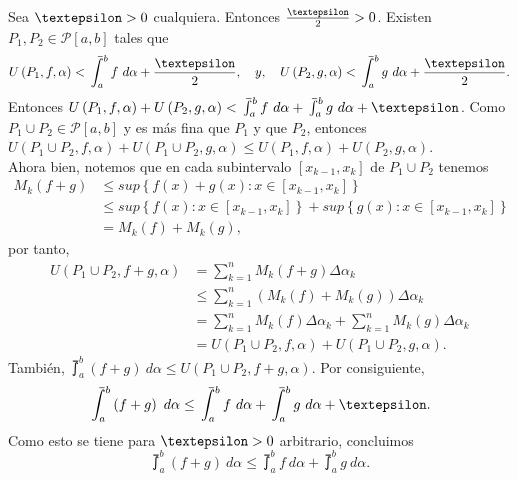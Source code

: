 Sea $\text{\textepsilon}>0$ cualquiera. Entonces $\frac{\text{\textepsilon}}{2}>0$. Existen $P_1,P_2\in\mathcal{P}\left[a,b\right]$ tales que
  \begin{equation*}
    U\left(P_1,f,\alpha\right) < \upint_a^b f\ d\alpha + \frac{\text{\textepsilon}}{2},\quad y,\quad U\left(P_2,g,\alpha\right) < \upint_a^b g\ d\alpha + \frac{\text{\textepsilon}}{2}.
  \end{equation*}
  Entonces $U\left(P_1,f,\alpha\right)+U\left(P_2,g,\alpha\right)<\upint_a^b f\ d\alpha + \upint_a^b g\ d\alpha + \text{\textepsilon}$. Como $P_1\cup P_2 \in \mathcal{P}\left[a,b\right]$ y es más fina que $P_1$ y que $P_2$, entonces $U\left(P_1\cup P_2,f,\alpha\right)+U\left(P_1\cup P_2,g,\alpha\right) \leq U\left(P_1,f,\alpha\right)+U\left(P_2,g,\alpha\right)$.\\
  Ahora bien, notemos que en cada subintervalo $\left[x_{k-1},x_k\right]$ de $P_1\cup P_2$ tenemos
  \begin{align*}
    M_k\left(f+g\right)&\leq sup\left\lbrace f\left(x\right)+g\left(x\right): x\in\left[x_{k-1},x_k\right]\right\rbrace\\
    &\leq sup\left\lbrace f\left(x\right): x\in\left[x_{k-1},x_k\right]\right\rbrace+sup\left\lbrace g\left(x\right): x\in\left[x_{k-1},x_k\right]\right\rbrace\\
    &=M_k\left(f\right)+M_k\left(g\right),
  \end{align*}
por tanto,
\begin{align*}
  U\left(P_1\cup P_2, f+g, \alpha\right)&= \sum_{k=1}^{n} M_k\left(f+g\right)\Delta\alpha_k\\
  &\leq\sum_{k=1}^{n} \left(M_k\left(f\right)+M_k\left(g\right)\right)\Delta\alpha_k\\
  &=\sum_{k=1}^{n} M_k\left(f\right)\Delta\alpha_k+\sum_{k=1}^{n} M_k\left(g\right)\Delta\alpha_k\\
  &=U\left(P_1\cup P_2, f, \alpha\right)+U\left(P_1\cup P_2, g, \alpha\right).
\end{align*}
También, $\upint_a^b\left(f+g\right)\ d\alpha \leq U\left(P_1\cup P_2, f+g, \alpha\right)$. Por consiguiente,
\begin{equation*}
\upint_a^b \left(f+g\right)\ d\alpha \leq \upint_a^b f\ d\alpha + \upint_a^b g\ d\alpha +  \text{\textepsilon}.
\end{equation*}
Como esto se tiene para $\text{\textepsilon}>0$ arbitrario, concluimos
\begin{equation*}
\upint_a^b \left(f+g\right)\ d\alpha \leq \upint_a^b f\ d\alpha + \upint_a^b g\ d\alpha .
\end{equation*}

